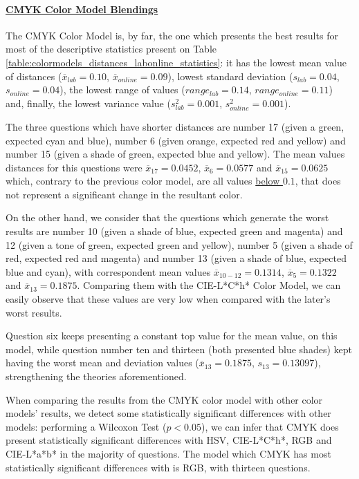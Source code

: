 \paragraph{\ul{CMYK Color Model Blendings}}
\label{par:cmykcolormodel}
%
The CMYK Color Model is, by far, the one which presents the best results for most of the descriptive statistics present on Table \ref{table:colormodels_distances_labonline_statistics}: it has the lowest mean value of distances ($\overline{x}_{lab} = 0.10$, $\overline{x}_{online} = 0.09$), lowest standard deviation ($s_{lab} = 0.04$, $s_{online} = 0.04$),
the lowest range of values ($range_{lab} = 0.14$, $range_{online} = 0.11$) and, finally, the lowest variance value ($s^2_{lab} = 0.001$, $s^2_{online} = 0.001$). \par
%
The three questions which have shorter distances are number 17 (given a green, expected cyan and blue), number 6 (given orange, expected red and yellow) and number 15 (given a shade of green, expected blue
and yellow). The mean values distances for this questions were $\overline{x}_{17} = 0.0452$, $\overline{x}_{6} = 0.0577$ and $\overline{x}_{15} = 0.0625$ which, contrary to the previous color model, are all values \ul{below $0.1$},
that does not represent a significant change in the resultant color. \par
%
On the other hand, we consider that the questions which generate the worst results are number 10 (given a shade of blue, expected green and magenta) and 12 (given a tone of green, expected green and yellow), number 5
(given a shade of red, expected red and magenta) and number 13 (given a shade of blue, expected blue and cyan), with correspondent mean values $\overline{x}_{10-12} = 0.1314$, $\overline{x}_{5} = 0.1322$ and
$\overline{x}_{13} = 0.1875$. Comparing them with the CIE-L*C*h* Color Model, we can easily observe that these values are very low when compared with the later's worst results. \par
%
Question six keeps presenting a constant top value for the mean value, on this model, while question number ten and thirteen (both presented blue shades) kept having the worst mean and deviation values ($\overline{x}_{13} = 0.1875$,
$s_{13} = 0.13097$), strengthening the theories aforementioned. \par
%
When comparing the results from the CMYK color model with other color models' results, we detect some statistically significant differences with other models: performing a Wilcoxon Test ($p < 0.05$), we can infer that CMYK does
present statistically significant differences with HSV, CIE-L*C*h*, RGB and CIE-L*a*b* in the majority of questions. The model which CMYK has most statistically significant differences with is RGB, with thirteen questions. \par
